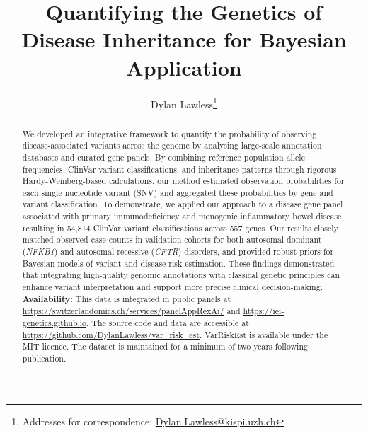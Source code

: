 
\usepackage[printonlyused,withpage,nohyperlinks]{acronym}
\usepackage{tikz}
\usetikzlibrary{calc}
\usepackage{amsmath, amssymb}


\title{Quantifying the Genetics of Disease Inheritance for Bayesian Application}

\author[1]{Dylan Lawless\thanks{Addresses for correspondence: \href{mailto:Dylan.Lawless@kispi.uzh.ch}{Dylan.Lawless@kispi.uzh.ch}}}

\maketitle
\justify

\begin{abstract}
We developed an integrative framework to quantify the probability of observing disease-associated variants across the genome by analysing large-scale annotation databases and curated gene panels. By combining reference population allele frequencies, ClinVar variant classifications, and inheritance patterns through rigorous Hardy-Weinberg-based calculations, our method estimated observation probabilities for each single nucleotide variant (SNV) and aggregated these probabilities by gene and variant classification. To demonstrate, we applied our approach to a disease gene panel  associated with primary immunodeficiency and monogenic inflammatory bowel disease, resulting in 54,814 ClinVar variant classifications across 557 genes. Our results closely matched observed case counts in validation cohorts for both autosomal dominant (\textit{NFKB1}) and autosomal recessive (\textit{CFTR}) disorders, and provided robust priors for Bayesian models of variant and disease risk estimation. These findings demonstrated that integrating high-quality genomic annotations with classical genetic principles can enhance variant interpretation and support more precise clinical decision-making.
\\[1ex]
\noindent \textbf{Availability:} This data is integrated in public panels at  \url{https://switzerlandomics.ch/services/panelAppRexAi/} and 
\url{https://iei-genetics.github.io}.
The source code and data are accessible at \url{https://github.com/DylanLawless/var_risk_est}. VarRiskEst is available under the MIT licence. 
The dataset is maintained for a minimum of two years following publication.
\end{abstract}
\clearpage

